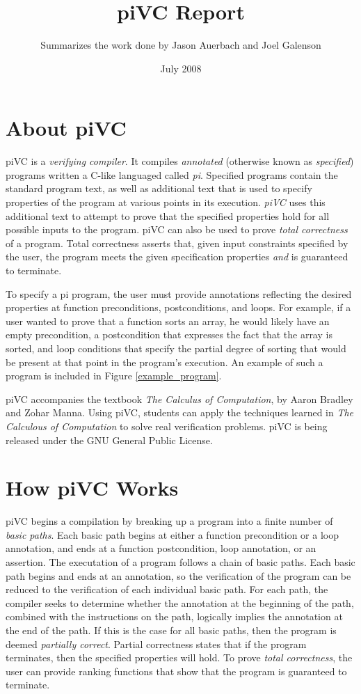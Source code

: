 \documentclass{article}
\begin{document}
\author{Summarizes the work done by Jason Auerbach and Joel Galenson}
\title{piVC Report}
\date{July 2008}
\maketitle

\section{About piVC}
piVC is a \textit{verifying compiler}. It compiles \textit{annotated} (otherwise known as \textit{specified}) programs written a C-like languaged called \textit{pi}. Specified programs contain the standard program text, as well as additional text that is used to specify properties of the program at various points in its execution. \textit{piVC} uses this additional text to attempt to prove that the specified properties hold for all possible inputs to the program. piVC can also be used to prove \textit{total correctness} of a program. Total correctness asserts that, given input constraints specified by the user, the program meets the given specification properties \textit{and} is guaranteed to terminate. 

To specify a pi program, the user must provide annotations reflecting the desired properties at function preconditions, postconditions, and loops. For example, if a user wanted to prove that a function sorts an array, he would likely have an empty precondition, a postcondition that expresses the fact that the array is sorted, and loop conditions that specify the partial degree of sorting that would be present at that point in the program's execution. An example of such a program is included in Figure \ref{example_program}.

piVC accompanies the textbook \textit{The Calculus of Computation}, by Aaron Bradley and Zohar Manna. Using piVC, students can apply the techniques learned in \textit{The Calculous of Computation} to solve real verification problems. piVC is being released under the GNU General Public License.

\section{How piVC Works}
piVC begins a compilation by breaking up a program into a finite number of \textit{basic paths}. Each basic path begins at either a function precondition or a loop annotation, and ends at a function postcondition, loop annotation, or an assertion. The executation of a program follows a chain of basic paths. Each basic path begins and ends at an annotation, so the verification of the program can be reduced to the verification of each individual basic path. For each path, the compiler seeks to determine whether the annotation at the beginning of the path, combined with the instructions on the path, logically implies the annotation at the end of the path. If this is the case for all basic paths, then the program is deemed \textit{partially correct}. Partial correctness states that if the program terminates, then the specified properties will hold. To prove \textit{total correctness}, the user can provide ranking functions that show that the program is guaranteed to terminate.
\end{document}
